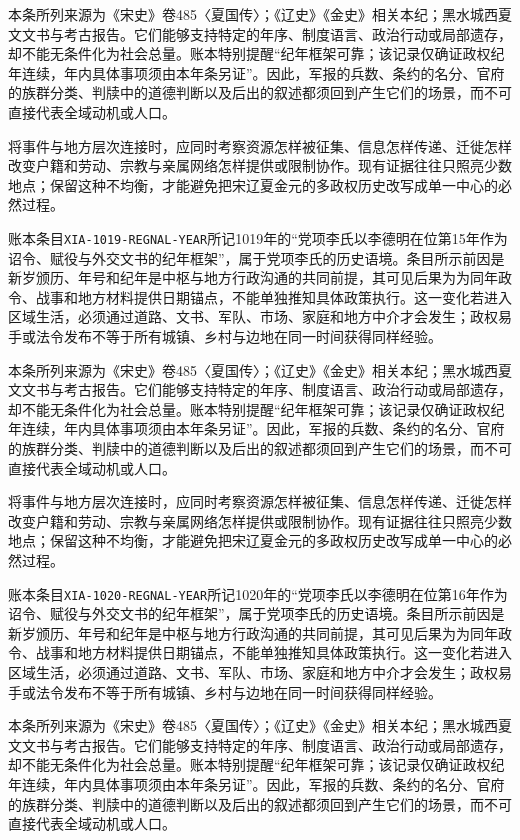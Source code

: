 本条所列来源为《宋史》卷485〈夏国传〉；《辽史》《金史》相关本纪；黑水城西夏文文书与考古报告。它们能够支持特定的年序、制度语言、政治行动或局部遗存，却不能无条件化为社会总量。账本特别提醒“纪年框架可靠；该记录仅确证政权纪年连续，年内具体事项须由本年条另证”。因此，军报的兵数、条约的名分、官府的族群分类、判牍中的道德判断以及后出的叙述都须回到产生它们的场景，而不可直接代表全域动机或人口。

将事件与地方层次连接时，应同时考察资源怎样被征集、信息怎样传递、迁徙怎样改变户籍和劳动、宗教与亲属网络怎样提供或限制协作。现有证据往往只照亮少数地点；保留这种不均衡，才能避免把宋辽夏金元的多政权历史改写成单一中心的必然过程。

账本条目\texttt{XIA-1019-REGNAL-YEAR}所记1019年的“党项李氏以李德明在位第15年作为诏令、赋役与外交文书的纪年框架”，属于党项李氏的历史语境。条目所示前因是新岁颁历、年号和纪年是中枢与地方行政沟通的共同前提，其可见后果为为同年政令、战事和地方材料提供日期锚点，不能单独推知具体政策执行。这一变化若进入区域生活，必须通过道路、文书、军队、市场、家庭和地方中介才会发生；政权易手或法令发布不等于所有城镇、乡村与边地在同一时间获得同样经验。

本条所列来源为《宋史》卷485〈夏国传〉；《辽史》《金史》相关本纪；黑水城西夏文文书与考古报告。它们能够支持特定的年序、制度语言、政治行动或局部遗存，却不能无条件化为社会总量。账本特别提醒“纪年框架可靠；该记录仅确证政权纪年连续，年内具体事项须由本年条另证”。因此，军报的兵数、条约的名分、官府的族群分类、判牍中的道德判断以及后出的叙述都须回到产生它们的场景，而不可直接代表全域动机或人口。

将事件与地方层次连接时，应同时考察资源怎样被征集、信息怎样传递、迁徙怎样改变户籍和劳动、宗教与亲属网络怎样提供或限制协作。现有证据往往只照亮少数地点；保留这种不均衡，才能避免把宋辽夏金元的多政权历史改写成单一中心的必然过程。

账本条目\texttt{XIA-1020-REGNAL-YEAR}所记1020年的“党项李氏以李德明在位第16年作为诏令、赋役与外交文书的纪年框架”，属于党项李氏的历史语境。条目所示前因是新岁颁历、年号和纪年是中枢与地方行政沟通的共同前提，其可见后果为为同年政令、战事和地方材料提供日期锚点，不能单独推知具体政策执行。这一变化若进入区域生活，必须通过道路、文书、军队、市场、家庭和地方中介才会发生；政权易手或法令发布不等于所有城镇、乡村与边地在同一时间获得同样经验。

本条所列来源为《宋史》卷485〈夏国传〉；《辽史》《金史》相关本纪；黑水城西夏文文书与考古报告。它们能够支持特定的年序、制度语言、政治行动或局部遗存，却不能无条件化为社会总量。账本特别提醒“纪年框架可靠；该记录仅确证政权纪年连续，年内具体事项须由本年条另证”。因此，军报的兵数、条约的名分、官府的族群分类、判牍中的道德判断以及后出的叙述都须回到产生它们的场景，而不可直接代表全域动机或人口。

